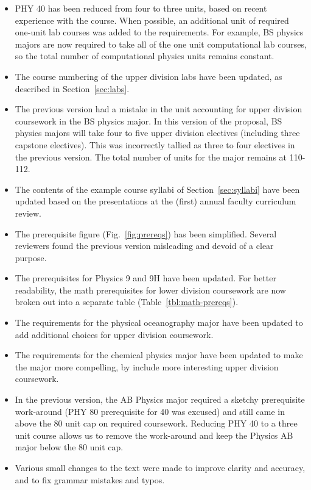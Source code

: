\documentclass[12pt]{article}
\begin{document}
\begin{itemize}
  \item PHY 40 has been reduced from four to three units, based on
    recent experience with the course.  When possible, an additional
    unit of required one-unit lab courses was added to the
    requirements.  For example, BS physics majors are now required to
    take all of the one unit computational lab courses, so the total
    number of computational physics units remains constant.
 \item The course numbering of the upper division labs have been updated, as
   described in Section~\ref{sec:labs}.   
 \item The previous version had a mistake in the unit accounting for
   upper division coursework in the BS physics major.  In this
   version of the proposal, BS physics majors will take four to five
   upper division electives (including three capstone electives).
   This was incorrectly tallied as three to four electives in the
   previous version.  The total number of units for the major remains
   at 110-112.
 \item The contents of the example course syllabi of
   Section~\ref{sec:syllabi} have been updated based on the
   presentations at the (first) annual faculty curriculum review.
 \item The prerequisite figure (Fig.~\ref{fig:prereqs}) has been
   simplified.  Several reviewers found the previous version
   misleading and devoid of a clear purpose.   
 \item The prerequisites for Physics 9 and 9H have been updated.  For
   better readability, the math prerequisites for lower division
   coursework are now broken out into a separate table (Table~\ref{tbl:math-prereqs}).
 \item The requirements for the physical oceanography major have been
   updated to add additional choices for upper division coursework. 
 \item The requirements for the chemical physics major have been
   updated to make the major more compelling, by include more
   interesting upper division coursework.
 \item In the previous version, the AB Physics major required a
   sketchy prerequisite work-around (PHY 80 prerequisite for 40 was
   excused) and still came in above the 80 unit cap on required
   coursework.  Reducing PHY 40 to a three unit course allows us to
   remove the work-around and keep the Physics AB major below the 80
   unit cap.
 \item Various small changes to the text were made to improve clarity
   and accuracy, and to fix grammar mistakes and typos.
\end{itemize}
\vskip 3cm
\tableofcontents
\end{document}
